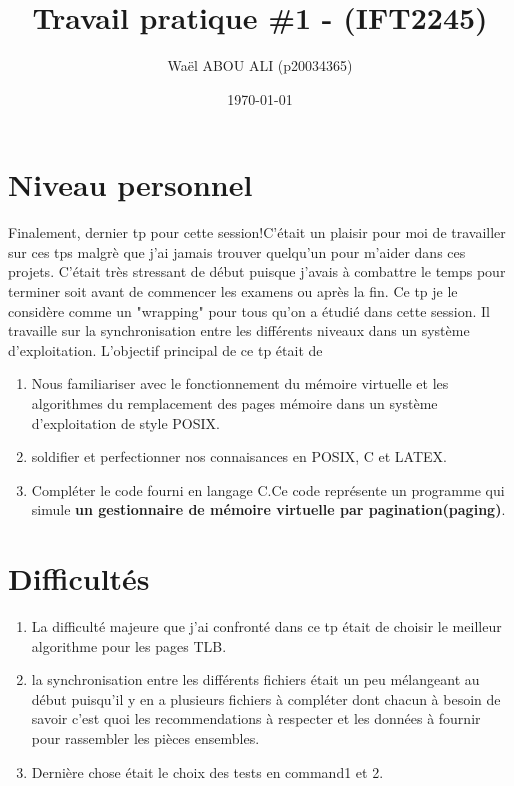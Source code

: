 \documentclass{article}
\begin{document}
\title{Travail pratique \#1 - (IFT2245)} 

\author{Wa\"{e}l ABOU ALI (p20034365)}
\date{\today}

\begin{titlingpage}
\maketitle

\end{titlingpage}


\section{Niveau personnel}
Finalement, dernier tp pour cette session!C'était un plaisir pour moi de travailler sur ces tps malgrè que j'ai jamais trouver quelqu'un pour m'aider dans ces projets. C'était très stressant de début puisque j'avais à combattre le temps pour terminer soit avant de commencer les examens ou après la fin. Ce tp je le considère comme un "wrapping" pour tous qu'on a étudié dans cette session. Il travaille sur la synchronisation entre les différents niveaux dans un système d'exploitation. L'objectif principal de ce tp était de
\begin{enumerate} 
\item Nous familiariser avec le fonctionnement du mémoire virtuelle et les algorithmes du remplacement des pages mémoire dans un système d'exploitation de style POSIX.
\item soldifier et perfectionner nos connaisances en POSIX, C et LATEX.
\item Compléter le code fourni en langage C.\newline Ce code représente un programme qui simule \textbf{un gestionnaire de mémoire virtuelle par pagination(paging)}.
\end{enumerate}

\section{Difficultés}
\begin{enumerate}
\item La difficulté majeure que j'ai confronté dans ce tp était de choisir le meilleur algorithme pour les pages TLB.
\item la synchronisation entre les différents fichiers était un peu mélangeant au début puisqu'il y en a plusieurs fichiers à compléter dont chacun à besoin de savoir c'est quoi les recommendations à respecter et les données à fournir pour rassembler les pièces ensembles.
\item Dernière chose était le choix des tests en command1 et 2.
\end{enumerate}
\end{document}

